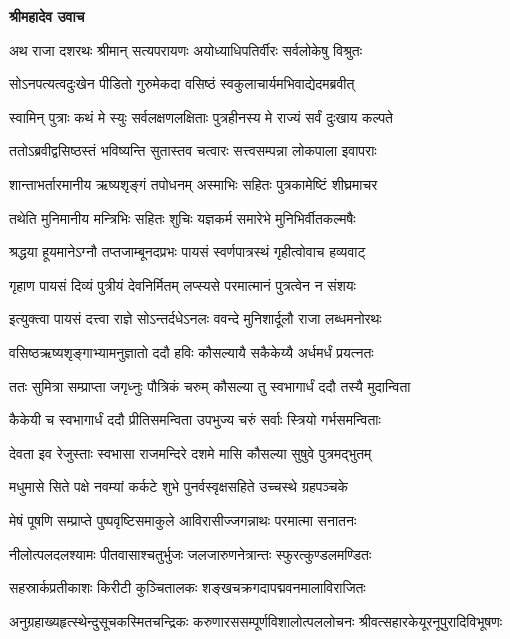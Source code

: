 \textbf{श्रीमहादेव उवाच}

\twolineshloka
{अथ राजा दशरथः श्रीमान् सत्यपरायणः}
{अयोध्याधिपतिर्वीरः सर्वलोकेषु विश्रुतः} %

\twolineshloka
{सोऽनपत्यत्वदुःखेन पीडितो गुरुमेकदा}
{वसिष्ठं स्वकुलाचार्यमभिवाद्येदमब्रवीत्} %

\twolineshloka
{स्वामिन् पुत्राः कथं मे स्युः सर्वलक्षणलक्षिताः}
{पुत्रहीनस्य मे राज्यं सर्वं दुःखाय कल्पते} %

\twolineshloka
{ततोऽब्रवीद्वसिष्ठस्तं भविष्यन्ति सुतास्तव}
{चत्वारः सत्त्वसम्पन्ना लोकपाला इवापराः} %

\twolineshloka
{शान्ताभर्तारमानीय ऋष्यशृङ्गं तपोधनम्}
{अस्माभिः सहितः पुत्रकामेष्टिं शीघ्रमाचर} %

\twolineshloka
{तथेति मुनिमानीय मन्त्रिभिः सहितः शुचिः}
{यज्ञकर्म समारेभे मुनिभिर्वीतकल्मषैः} %

\twolineshloka
{श्रद्धया हूयमानेऽग्नौ तप्तजाम्बूनदप्रभः}
{पायसं स्वर्णपात्रस्थं गृहीत्वोवाच हव्यवाट्} %

\twolineshloka
{गृहाण पायसं दिव्यं पुत्रीयं देवनिर्मितम्}
{लप्स्यसे परमात्मानं पुत्रत्वेन न संशयः} %

\twolineshloka
{इत्युक्त्वा पायसं दत्त्वा राज्ञे सोऽन्तर्दधेऽनलः}
{ववन्दे मुनिशार्दूलौ राजा लब्धमनोरथः} %

\twolineshloka
{वसिष्ठऋष्यशृङ्गाभ्यामनुज्ञातो ददौ हविः}
{कौसल्यायै सकैकेय्यै अर्धमर्धं प्रयत्नतः} %

\twolineshloka
{ततः सुमित्रा सम्प्राप्ता जगृध्नुः पौत्रिकं चरुम्}
{कौसल्या तु स्वभागार्धं ददौ तस्यै मुदान्विता} %

\twolineshloka
{कैकेयी च स्वभागार्धं ददौ प्रीतिसमन्विता}
{उपभुज्य चरुं सर्वाः स्त्रियो गर्भसमन्विताः} %

\twolineshloka
{देवता इव रेजुस्ताः स्वभासा राजमन्दिरे}
{दशमे मासि कौसल्या सुषुवे पुत्रमद्भुतम्} %

\twolineshloka
{मधुमासे सिते पक्षे नवम्यां कर्कटे शुभे}
{पुनर्वस्वृक्षसहिते उच्चस्थे ग्रहपञ्चके} %

\twolineshloka
{मेषं पूषणि सम्प्राप्ते पुष्पवृष्टिसमाकुले}
{आविरासीज्जगन्नाथः परमात्मा सनातनः} %

\twolineshloka
{नीलोत्पलदलश्यामः पीतवासाश्चतुर्भुजः}
{जलजारुणनेत्रान्तः स्फुरत्कुण्डलमण्डितः} %

\twolineshloka
{सहस्रार्कप्रतीकाशः किरीटी कुञ्चितालकः}
{शङ्खचक्रगदापद्मवनमालाविराजितः} %

\threelineshloka
{अनुग्रहाख्यहृत्स्थेन्दुसूचकस्मितचन्द्रिकः}
{करुणारससम्पूर्णविशालोत्पललोचनः}
{श्रीवत्सहारकेयूरनूपुरादिविभूषणः} %

